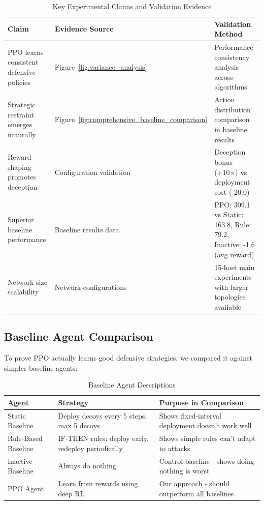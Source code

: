 \documentclass[12pt,oneside]{article}
\begin{document}
\begin{table}[H]
\centering
\caption{Key Experimental Claims and Validation Evidence}
\label{tab:validation_claims}
\small
\begin{tabular}{|p{4cm}|p{4cm}|p{4cm}|}
\hline
\rowcolor{cwBorder!30} \textbf{Claim} & \textbf{Evidence Source} & \textbf{Validation Method} \\
\hline
PPO learns consistent defensive policies & Figure~\ref{fig:variance_analysis} & Performance consistency analysis across algorithms \\
\hline
Strategic restraint emerges naturally & Figure~\ref{fig:comprehensive_baseline_comparison} & Action distribution comparison in baseline results \\
\hline
Reward shaping promotes deception & Configuration validation & Deception bonus (+10×) vs deployment cost (-20.0) \\
\hline
Superior baseline performance & Baseline results data & PPO: 309.1 vs Static: 163.8, Rule: 79.2, Inactive: -1.6 (avg reward) \\
\hline
Network size scalability & Network configurations & 15-host main experiments with larger topologies available \\
\hline
\end{tabular}
\end{table}

\subsection{Baseline Agent Comparison}

To prove PPO actually learns good defensive strategies, we compared it against simpler baseline agents:

\begin{table}[H]
\centering
\caption{Baseline Agent Descriptions}
\label{tab:baseline_agents}
\small
\begin{tabular}{|p{2.5cm}|p{4cm}|p{5.5cm}|}
\hline
\rowcolor{cwBorder!30} \textbf{Agent} & \textbf{Strategy} & \textbf{Purpose in Comparison} \\
\hline
Static Baseline & Deploy decoys every 5 steps, max 5 decoys & Shows fixed-interval deployment doesn't work well \\
\hline
Rule-Based Baseline & IF-THEN rules: deploy early, redeploy periodically & Shows simple rules can't adapt to attacks \\
\hline
Inactive Baseline & Always do nothing & Control baseline - shows doing nothing is worst \\
\hline
PPO Agent & Learn from rewards using deep RL & Our approach - should outperform all baselines \\
\hline
\end{tabular}
\end{table}
\end{document}
